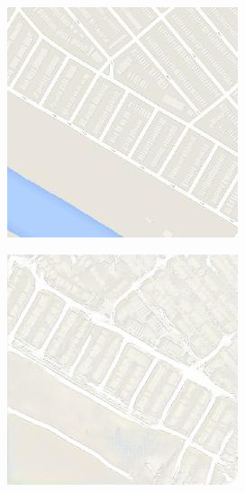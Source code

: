 \begin{figure}
  \begin{subfigure}[t]{.2\textwidth}
    \centering
    \includegraphics[width=\linewidth]{images/cycleGanResults/Maps6_Or_Ld120_E100_Lr0002.jpg}
  \end{subfigure}
  \begin{subfigure}[t]{.2\textwidth}
    \centering
    \includegraphics[width=\linewidth]{images/cycleGanResults/Maps6Ld120_E100_Lr0002.jpg}

\end{subfigure}
\end{figure}
